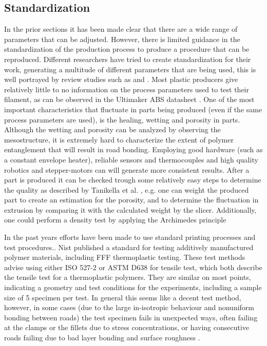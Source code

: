 \subsection{Standardization}
    \label{Standarization}
In the prior sections it has been made clear that there are a wide range of parameters that can be adjusted. However, there is limited guidance in the standardization of the production process to produce a procedure that can be reproduced. Different researchers have tried to create standardization for their work, generating a multitude of different parameters that are being used, this is well portrayed by review studies such as \cite{Peterson2019ReviewPerspective} and \cite{Popescu2018FDMReview}.  Most plastic producers give relatively little to no information on the process parameters used to test their filament, as can be observed in the Ultimaker ABS datasheet \cite{TechnicalUM}. One of the most important characteristics that fluctuate in parts being produced (even if the same process parameters are used), is the healing, wetting and porosity in parts. Although the wetting and porosity can be analyzed by observing the mesostructure, it is extremely hard to characterize the extent of polymer entanglement that will result in road bonding. Employing good hardware (such as a constant envelope heater), reliable sensors and thermocouples and high quality robotics and stepper-motors can will generate more consistent results. After a part is produced it can be checked trough some relatively easy steps to determine the quality as described by Tanikella et al. \cite{Tanikella2017TensilePrinting}, e.g. one can weight the produced part to create an estimation for the porosity, and to determine the fluctuation in extrusion by comparing it with the calculated weight by the slicer. Additionally, one could perform a density test by applying the Archimedes principle

In the past years efforts have been made to use standard printing processes and test procedures.. Nist \cite{T.Bauer2015NIST:} published a standard for testing additively manufactured polymer materials, including FFF thermoplastic testing. These test methods advise using either ISO 527-2 \cite{Afd2016NEN-EN-ISO527-1} or ASTM D638 \cite{Materials2015ASTMD638-14} for tensile test, which both describe the tensile test for a thermoplastic polymers. They are similar on most points, indicating a geometry and test conditions for the experiments, including a sample size of 5 specimen per test. In general this seems like a decent test method, however, in some cases (due to the large in-isotropic behaviour and nonuniform bonding between roads) the test specimen fails in unexpected ways, often failing at the clamps or the fillets due to stress concentrations\cite{Alaimo2017InfluenceParts}, or having consecutive roads failing due to bad layer bonding and surface roughness \cite{Ahn2002AnisotropicABS} \cite{Bertoldi1998MechanicalDeposition}. 

